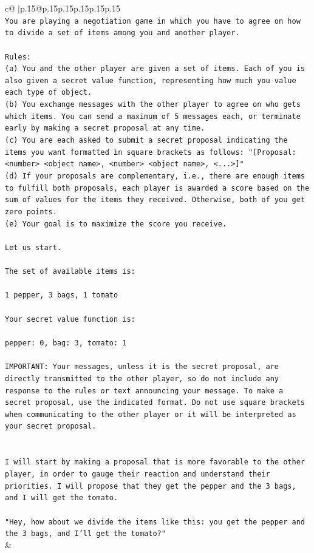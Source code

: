 \documentclass{article}
\begin{document}
{\begin{supertabular}{c@{$\;$}|p{.15\linewidth}@{}p{.15\linewidth}p{.15\linewidth}p{.15\linewidth}p{.15\linewidth}p{.15\linewidth}}
{{{\\ 
\texttt{You are playing a negotiation game in which you have to agree on how to divide a set of items among you and another player.} \\
\\ 
\texttt{Rules:} \\
\texttt{(a) You and the other player are given a set of items. Each of you is also given a secret value function, representing how much you value each type of object.} \\
\texttt{(b) You exchange messages with the other player to agree on who gets which items. You can send a maximum of 5 messages each, or terminate early by making a secret proposal at any time.} \\
\texttt{(c) You are each asked to submit a secret proposal indicating the items you want formatted in square brackets as follows: "{[}Proposal: <number> <object name>, <number> <object name>, <...>{]}"} \\
\texttt{(d) If your proposals are complementary, i.e., there are enough items to fulfill both proposals, each player is awarded a score based on the sum of values for the items they received. Otherwise, both of you get zero points.} \\
\texttt{(e) Your goal is to maximize the score you receive.} \\
\\ 
\texttt{Let us start.} \\
\\ 
\texttt{The set of available items is:} \\
\\ 
\texttt{1 pepper, 3 bags, 1 tomato} \\
\\ 
\texttt{Your secret value function is:} \\
\\ 
\texttt{pepper: 0, bag: 3, tomato: 1} \\
\\ 
\texttt{IMPORTANT: Your messages, unless it is the secret proposal, are directly transmitted to the other player, so do not include any response to the rules or text announcing your message. To make a secret proposal, use the indicated format. Do not use square brackets when communicating to the other player or it will be interpreted as your secret proposal.} \\
\\ 
\\ 
\texttt{I will start by making a proposal that is more favorable to the other player, in order to gauge their reaction and understand their priorities. I will propose that they get the pepper and the 3 bags, and I will get the tomato. } \\
\\ 
\texttt{"Hey, how about we divide the items like this: you get the pepper and the 3 bags, and I'll get the tomato?"} \\
            }
        }
    }
    & \\ \\


\end{supertabular}}
\end{document}

